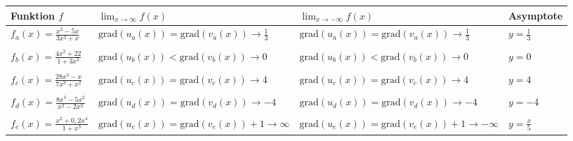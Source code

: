 \documentclass[varwidth]{article}
\begin{document}
\begin{tabular}{|l|l|l|l|}
    \hline
    Funktion $f$ & $\displaystyle\lim_{x\to\infty}f(x)$ & $\displaystyle\lim_{x\to-\infty}f(x)$ & Asymptote \\
    \hline
    $\displaystyle f_a(x) = \frac{x^2-5x}{3x^2+x}$
        & $\text{grad}(u_a(x)) = \text{grad}(v_a(x)) \rightarrow \frac13$
        & $\text{grad}(u_a(x)) = \text{grad}(v_a(x)) \rightarrow \frac13$
        & $y = \frac13$ \\
    &&&\\
    $\displaystyle f_b(x) = \frac{4x^2+22}{1+3x^3}$
        & $\text{grad}(u_b(x)) < \text{grad}(v_b(x)) \rightarrow 0$
        & $\text{grad}(u_b(x)) < \text{grad}(v_b(x)) \rightarrow 0$
        & $y = 0$ \\
    &&&\\
    $\displaystyle f_c(x) = \frac{28x^3-x}{7x^3+x^2}$
        & $\text{grad}(u_c(x)) = \text{grad}(v_c(x)) \rightarrow 4$
        & $\text{grad}(u_c(x)) = \text{grad}(v_c(x)) \rightarrow 4$
        & $y = 4$ \\
    &&&\\
    $\displaystyle f_d(x) = \frac{8x^3-5x^2}{x^2-2x^3}$
        & $\text{grad}(u_d(x)) = \text{grad}(v_d(x)) \rightarrow -4$
        & $\text{grad}(u_d(x)) = \text{grad}(v_d(x)) \rightarrow -4$
        & $y = -4$ \\
    &&&\\
    $\displaystyle f_e(x) = \frac{x^2+0,2x^4}{1+x^3}$
        & $\text{grad}(u_e(x)) = \text{grad}(v_e(x))+1 \rightarrow \infty$
        & $\text{grad}(u_e(x)) = \text{grad}(v_e(x))+1 \rightarrow -\infty$
        & $y = \frac x5$ \\
    \hline
\end{tabular}
\end{document}
